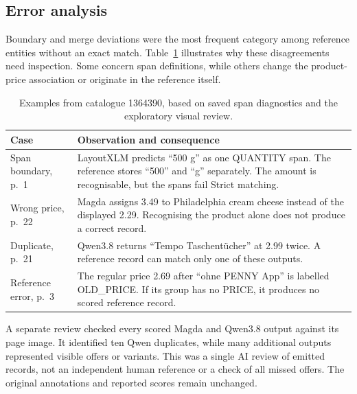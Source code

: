 \subsection{Error analysis}\label{sec:error-results}
Boundary and merge deviations were the most frequent category among reference entities without an exact match. Table~\ref{tab:examples} illustrates why these disagreements need inspection. Some concern span definitions, while others change the product-price association or originate in the reference itself.

\begin{table}[htbp]
\centering\small
\caption{Examples from catalogue 1364390, based on saved span diagnostics and the exploratory visual review.}\label{tab:examples}
\begin{tabularx}{\linewidth}{@{}>{\raggedright\arraybackslash}p{2.4cm}X@{}}
\toprule Case & Observation and consequence \\ \midrule
Span boundary, p.~1 & LayoutXLM predicts ``500 g'' as one QUANTITY span. The reference stores ``500'' and ``g'' separately. The amount is recognisable, but the spans fail Strict matching. \\
Wrong price, p.~22 & Magda assigns 3.49 to Philadelphia cream cheese instead of the displayed 2.29. Recognising the product alone does not produce a correct record. \\
Duplicate, p.~21 & Qwen3.8 returns ``Tempo Taschent\"ucher'' at 2.99 twice. A reference record can match only one of these outputs. \\
Reference error, p.~3 & The regular price 2.69 after ``ohne PENNY App'' is labelled OLD\_PRICE. If its group has no PRICE, it produces no scored reference record. \\
\bottomrule
\end{tabularx}
\end{table}

A separate review checked every scored Magda and Qwen3.8 output against its page image. It identified ten Qwen duplicates, while many additional outputs represented visible offers or variants. This was a single AI review of emitted records, not an independent human reference or a check of all missed offers. The original annotations and reported scores remain unchanged.
